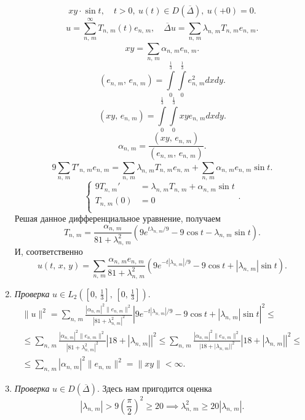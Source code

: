 \documentclass[a4paper]{article}
\begin{document}
\begin{sol}
\begin{enumerate}
\[		xy \cdot \sin t,\quad t>0,\
		u(t) \in  D\left( \overline{\Delta} \right) ,\
		u(+0)=0
	.\] 
\[
	u= \sum_{n,\,m}^{\infty} T_{n,\,m}(t) e_{n,\,m},
	\quad \overline{\Delta}u= \sum_{n,\,m}^{} \lambda_{n,\,m}
	 T_{n,\,m}e_{n,\,m}
.\] 
\[
xy= \sum_{n,\,m}^{} \alpha_{n,\,m}e_{n,\,m}
.\] 
\[
	(e_{n,\,m},\,e_{n,\,m})	=
	\int\limits_{0}^{\frac{1}{3}} \int\limits_{0}^{\frac{1}{3}} e_{n,\,m}^2 dxdy
.\] 
\[
	(xy,\,e_{n,\,m})= \int\limits_{0}^{\frac{1}{3}} 
	\int\limits_{0}^{\frac{1}{3}} xy e_{n,\,m}dxdy 
.\] 
\[
	\alpha_{n,\,m}= \frac{(xy,\,e_{n,\,m})}{(e_{n,\,m},\,
	e_{n,\,m})}
.\] 
\[
9\sum_{n,\,m}^{} T'_{n,\,m} e_{n,\,m}
= \sum_{n,\,m}^{} \lambda_{n,\,m} T_{n,\,m} e_{n,\,m}+\sum_{n,\,m}^{} \alpha_{n,\,m}
 e_{n,\,m}\sin t
.\] 
\[
\left\{
\begin{aligned}
	9 T_{n,\,m}'&=\lambda_{n,\,m}T_{n,\,m}+\alpha_{n,\,m}\sin t\\
	T_{n,\,m}(0)&= 0 \\
\end{aligned}
\right.
.\] 
Решая данное дифференциальное уравнение, получаем
\[
	T_{n,\,m}= \frac{\alpha_{n,\,m}}{81+\lambda_{n,\,m}^2}
	\left( 9 e^{t \lambda_{n,\,m} /9}-9 \cos t-\lambda_{n,\,m} \sin t \right) 
.\] 
И, соответственно
\[
	u(t,\,x,\,y)=\sum_{n,\,m}^{}  \frac{\alpha_{n,\,m} e_{n,\,m}}{81+\lambda_{n,\,m}^2}
	\left( 9 e^{-t |\lambda_{n,\,m}| /9}-9 \cos t+|\lambda_{n,\,m}| \sin t \right) 
.\]
\item \emph{Проверка} $\displaystyle u \in L_2 \left( 
	\left[ 0,\,\frac{1}{3} \right] ,\,\left[ 0,\,\frac{1}{3} \right] \right) $.
\label{it:6}
\begin{multline*}
\| u\|^2 = \sum_{n,\,m}^{}  \frac{|\alpha_{n,\,m}|^2 \|e_{n,\,m}\|
^2}{|81+\lambda_{n,\,m}^2|^2}
	\left| 9 e^{-t |\lambda_{n,\,m}| /9}-9 \cos t+|\lambda_{n,\,m}| \sin t \right|^2\le 
\\ \le \sum_{n,\,m}^{} \frac{|\alpha_{n,\,m}|^2 \| e_{n,\,m}\|^2}{|81+\lambda_{n,\,m}^2|^2}\left| 18+|\lambda_{n,\,m}| \right| ^2
\le 
 \sum_{n,\,m}^{} \frac{|\alpha_{n,\,m}|^2 \| e_{n,\,m}\|^2}{|18+|\lambda_{n,\,m}||^2}\left| 18+|\lambda_{n,\,m}| \right| ^2\le \\
 \le \sum_{n,\,m}^{} |\alpha_{n,\,m}|^2 \| e_{n,\,m}\|^2=
 \| xy\|<\infty
.\end{multline*} 
\item \emph{Проверка} $u \in D\left( \overline{\Delta} \right) $.
	Здесь нам пригодится оценка
	\[
		|\lambda_{n,\,m}|>9 \left( \frac{\pi}{2} \right) ^2
		\ge 20 \implies \lambda_{n,\,m}^2 \ge 20 |\lambda_{n,\,m}|
	.\] 
\begin{multline*}

\end{multline*}
\end{enumerate}
\end{sol}
\end{document}
